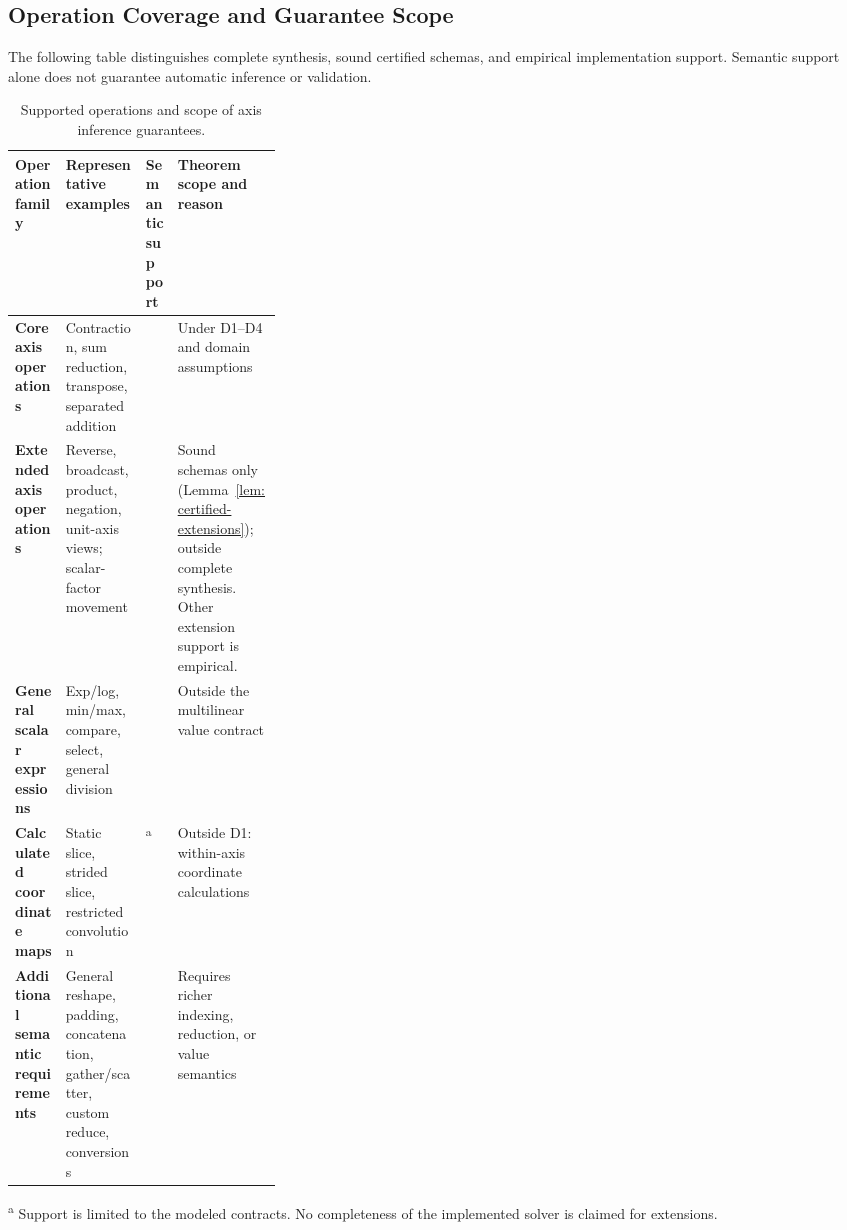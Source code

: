 \subsection{Operation Coverage and Guarantee Scope}
\label{app:operation-coverage}
The following table distinguishes complete synthesis, sound certified schemas,
and empirical implementation support. Semantic support alone does
not guarantee automatic inference or validation.

\begin{table}[!htbp]
\caption{Supported operations and scope of axis inference guarantees.}
\label{tab:semantic-coverage}
\centering
\small
\setlength{\tabcolsep}{4pt}
\renewcommand{\arraystretch}{1}
\begin{tabularx}{\linewidth}{@{}>{\raggedright\arraybackslash}p{0.19\linewidth}Y>{\centering\arraybackslash}p{0.12\linewidth}Y@{}}\toprule
Operation family & Representative examples & Semantic support & Theorem scope and reason\\[2pt]\midrule
\textbf{Core axis operations}
& Contraction, sum reduction, transpose, separated addition
& \textcolor{green!45!black}{}
& \textcolor{green!45!black}{} Under D1--D4 and domain assumptions\\
\addlinespace
\textbf{Extended axis operations}
& Reverse, broadcast, product, negation, unit-axis views; scalar-factor movement
& \textcolor{green!45!black}{}
& Sound schemas only (Lemma~\ref{lem:certified-extensions}); outside complete
synthesis. Other extension support is empirical.\\
\addlinespace
\textbf{General scalar expressions}
& Exp/log, min/max, compare, select, general division
& \textcolor{green!45!black}{}
& \textcolor{red!75!black}{} Outside the multilinear value contract\\
\addlinespace
\textbf{Calculated coordinate maps}
& Static slice, strided slice, restricted convolution
& \textcolor{green!45!black}{}\textsuperscript{a}
& \textcolor{red!75!black}{} Outside D1: within-axis coordinate calculations\\
\addlinespace
\textbf{Additional semantic requirements}
& General reshape, padding, concatenation, gather/scatter, custom reduce, conversions
& \textcolor{red!75!black}{}
& \textcolor{red!75!black}{} Requires richer indexing, reduction, or value semantics\\\bottomrule
\end{tabularx}
\par\smallskip
\begin{minipage}{\linewidth}
\footnotesize
\textsuperscript{a} Support is limited to the modeled contracts.
No completeness of the implemented solver is claimed for extensions.
\end{minipage}
\end{table}
